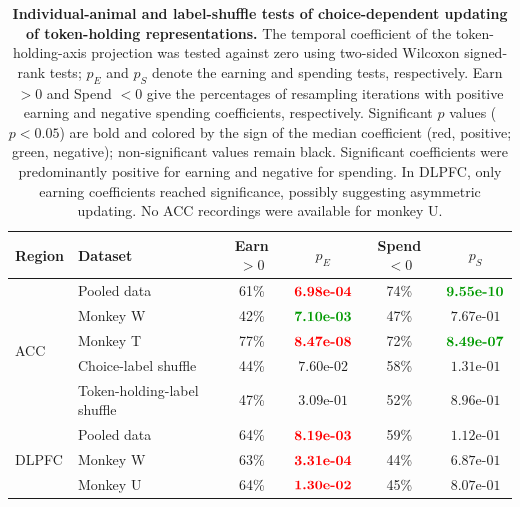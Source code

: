 \documentclass[pdflatex,sn-mathphys-num]{sn-jnl}%
\begin{document}
\clearpage
\setcounter{table}{0}
\renewcommand{\tablename}{Supplementary Table}
\renewcommand{\theHtable}{S\arabic{table}}
\begin{table}[p]
\centering
\caption{\textbf{Individual-animal and label-shuffle tests of choice-dependent updating of token-holding representations.} The temporal coefficient of the token-holding-axis projection was tested against zero using two-sided Wilcoxon signed-rank tests; $p_E$ and $p_S$ denote the earning and spending tests, respectively. Earn $>0$ and Spend $<0$ give the percentages of resampling iterations with positive earning and negative spending coefficients, respectively. Significant $p$ values ($p<0.05$) are bold and colored by the sign of the median coefficient (red, positive; green, negative); non-significant values remain black. Significant coefficients were predominantly positive for earning and negative for spending. In DLPFC, only earning coefficients reached significance, possibly suggesting asymmetric updating. No ACC recordings were available for monkey U.}
\label{tab:supp_state_updating}
\small
\begin{tabular*}{\textwidth}{@{\extracolsep{\fill}}llcccc@{}}
\toprule
Region & Dataset & Earn $>0$ & $p_E$ & Spend $<0$ & $p_S$ \\
\midrule
\multirow{5}{*}{ACC}
 & Pooled data & 61\% & $\textcolor{red}{\text{\bfseries \mbox{6.98e-04}}}$ & 74\% & $\textcolor{green!60!black}{\text{\bfseries \mbox{9.55e-10}}}$ \\
 & Monkey W & 42\% & $\textcolor{green!60!black}{\text{\bfseries \mbox{7.10e-03}}}$ & 47\% & $\mbox{7.67e-01}$ \\
 & Monkey T & 77\% & $\textcolor{red}{\text{\bfseries \mbox{8.47e-08}}}$ & 72\% & $\textcolor{green!60!black}{\text{\bfseries \mbox{8.49e-07}}}$ \\
\cmidrule(l){2-6}
 & Choice-label shuffle & 44\% & $\mbox{7.60e-02}$ & 58\% & $\mbox{1.31e-01}$ \\
 & Token-holding-label shuffle & 47\% & $\mbox{3.09e-01}$ & 52\% & $\mbox{8.96e-01}$ \\
\midrule
\multirow{6}{*}{DLPFC}
 & Pooled data & 64\% & $\textcolor{red}{\text{\bfseries \mbox{8.19e-03}}}$ & 59\% & $\mbox{1.12e-01}$ \\
 & Monkey W & 63\% & $\textcolor{red}{\text{\bfseries \mbox{3.31e-04}}}$ & 44\% & $\mbox{6.87e-01}$ \\
 & Monkey U & 64\% & $\textcolor{red}{\text{\bfseries \mbox{1.30e-02}}}$ & 45\% & $\mbox{8.07e-01}$ \\

\end{tabular*}
\end{table}
\end{document}
